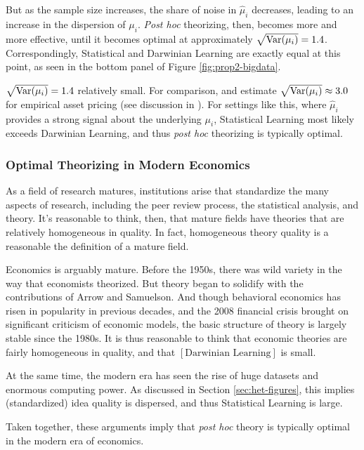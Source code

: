 \documentclass[12pt,english]{article}
\theoremstyle{plain}
\theoremstyle{plain}
\begin{document}
But as the sample size increases, the share of noise in $\hat{\mu}_i$ decreases, leading to an increase in the dispersion of $\mu_i$. \emph{Post hoc} theorizing, then, becomes more and more effective, until it becomes optimal at approximately $\sqrt{\text{Var}(\mu_i)}=1.4$. Correspondingly, Statistical and Darwinian Learning are exactly equal at this point, as seen in the bottom panel of Figure \ref{fig:prop2-bigdata}.

$\sqrt{\text{Var}(\mu_i)}=1.4$ relatively small. For comparison, \citet{chen2020publication} and \citet{jensen2023there} estimate $\sqrt{\text{Var}(\mu_i)}\approx 3.0$ for empirical asset pricing (see discussion in \citealt{chen2022publication}). For settings like this, where $\hat{\mu}_i$ provides a strong signal about the underlying $\mu_i$, Statistical Learning most likely exceeds Darwinian Learning, and thus \emph{post hoc} theorizing is typically optimal.


\subsubsection{Optimal Theorizing in Modern Economics}\label{sec:het-econcomment}

As a field of research matures, institutions arise that standardize the many aspects of research, including the peer review process, the statistical analysis, and  theory. It's reasonable to think, then, that mature fields have theories that are relatively homogeneous in quality. In fact, homogeneous theory quality is a reasonable the definition of a mature field.

Economics is arguably mature. Before the 1950s, there was wild variety in the way that economists theorized. But theory began to solidify with the contributions of Arrow and Samuelson. And though behavioral economics has risen in popularity in previous decades, and the 2008 financial crisis brought on significant criticism of economic models, the basic structure of theory is largely stable since the 1980s. It is thus reasonable to think that economic theories are fairly homogeneous in quality, and that $\left[\text{Darwinian Learning}\right]$ is small. 

At the same time, the modern era has seen the rise of huge datasets and enormous computing power. As discussed in Section \ref{sec:het-figures}, this implies (standardized) idea quality is dispersed, and thus Statistical Learning is large. 

Taken together, these arguments imply that \emph{post hoc} theory is typically optimal in the modern era of economics.
\end{document}
